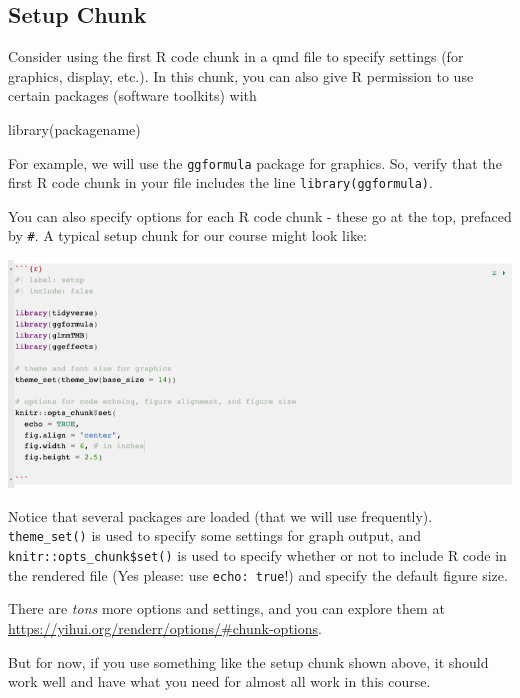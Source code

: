 \documentclass[
  letterpaper,
  DIV=11,
  numbers=noendperiod]{scrreprt}
\newenvironment{Shaded}{\begin{snugshade}}{\end{snugshade}}
\newcommand{\FunctionTok}[1]{\textcolor[rgb]{0.28,0.35,0.67}{#1}}
\newcommand{\NormalTok}[1]{\textcolor[rgb]{0.00,0.23,0.31}{#1}}
\theoremstyle{remark}
\begin{document}
\subsection{Setup Chunk}\label{setup-chunk}

Consider using the first R code chunk in a qmd file to specify settings
(for graphics, display, etc.). In this chunk, you can also give R
permission to use certain packages (software toolkits) with

\begin{Shaded}
\begin{Highlighting}[]
\FunctionTok{library}\NormalTok{(packagename) }
\end{Highlighting}
\end{Shaded}

For example, we will use the \texttt{ggformula} package for graphics.
So, verify that the first R code chunk in your file includes the line
\texttt{library(ggformula)}.

You can also specify options for each R code chunk - these go at the
top, prefaced by \texttt{\#\textbar{}}. A typical setup chunk for our
course might look like:

\begin{center}
\includegraphics[width=0.85\linewidth,height=\textheight,keepaspectratio]{images/setup-chunk.png}
\end{center}

Notice that several packages are loaded (that we will use frequently).
\texttt{theme\_set()} is used to specify some settings for graph output,
and \texttt{knitr::opts\_chunk\$set()} is used to specify whether or not
to include R code in the rendered file (Yes please: use
\texttt{echo:\ true}!) and specify the default figure size.

There are \emph{tons} more options and settings, and you can explore
them at \url{https://yihui.org/renderr/options/\#chunk-options}.

But for now, if you use something like the setup chunk shown above, it
should work well and have what you need for almost all work in this
course.
\end{document}

